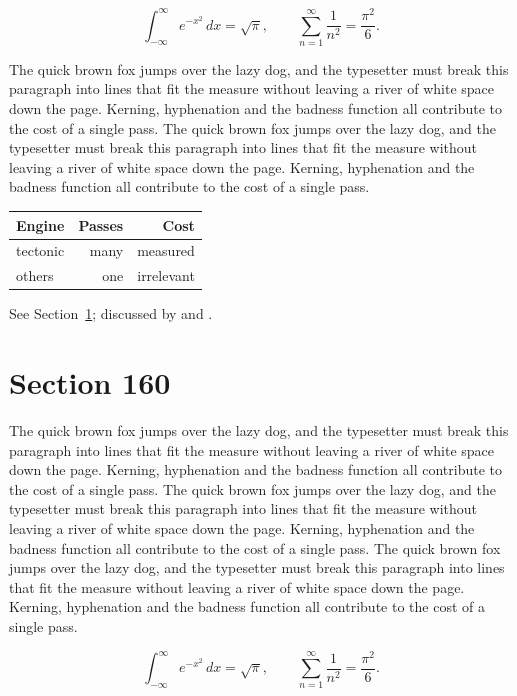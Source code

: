 \documentclass{article}
\begin{document}
\begin{equation}\label{eq:159}
\int_{-\infty}^{\infty} e^{-x^{2}}\,dx = \sqrt{\pi}, \qquad
\sum_{n=1}^{\infty} \frac{1}{n^{2}} = \frac{\pi^{2}}{6}.
\end{equation}

The quick brown fox jumps over the lazy dog, and the typesetter must break this paragraph into lines that fit the measure without leaving a river of white space down the page. Kerning, hyphenation and the badness function all contribute to the cost of a single pass. The quick brown fox jumps over the lazy dog, and the typesetter must break this paragraph into lines that fit the measure without leaving a river of white space down the page. Kerning, hyphenation and the badness function all contribute to the cost of a single pass. 

\begin{center}
\begin{tabular}{lrr}
\toprule
Engine & Passes & Cost \\
\midrule
tectonic & many & measured \\
others & one & irrelevant \\
\bottomrule
\end{tabular}
\end{center}

See Section~\ref{sec:160}; discussed by \textcite{k5} and \textcite{l2}.
\section{Section 160}
\label{sec:160}
The quick brown fox jumps over the lazy dog, and the typesetter must break this paragraph into lines that fit the measure without leaving a river of white space down the page. Kerning, hyphenation and the badness function all contribute to the cost of a single pass. The quick brown fox jumps over the lazy dog, and the typesetter must break this paragraph into lines that fit the measure without leaving a river of white space down the page. Kerning, hyphenation and the badness function all contribute to the cost of a single pass. The quick brown fox jumps over the lazy dog, and the typesetter must break this paragraph into lines that fit the measure without leaving a river of white space down the page. Kerning, hyphenation and the badness function all contribute to the cost of a single pass. 

\begin{equation}\label{eq:160}
\int_{-\infty}^{\infty} e^{-x^{2}}\,dx = \sqrt{\pi}, \qquad
\sum_{n=1}^{\infty} \frac{1}{n^{2}} = \frac{\pi^{2}}{6}.
\end{equation}
\end{document}
